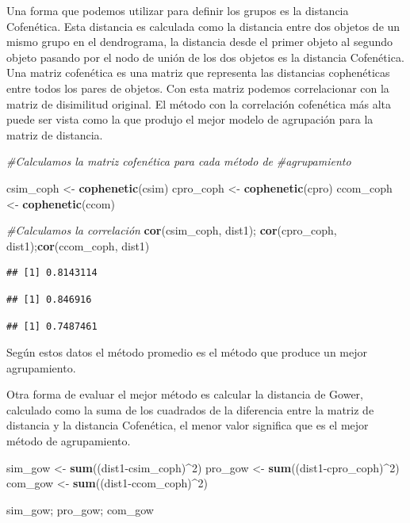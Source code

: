 \documentclass[]{book}
\newenvironment{Shaded}{\begin{snugshade}}{\end{snugshade}}
\newcommand{\KeywordTok}[1]{\textcolor[rgb]{0.13,0.29,0.53}{\textbf{{#1}}}}
\newcommand{\DecValTok}[1]{\textcolor[rgb]{0.00,0.00,0.81}{{#1}}}
\newcommand{\StringTok}[1]{\textcolor[rgb]{0.31,0.60,0.02}{{#1}}}
\newcommand{\CommentTok}[1]{\textcolor[rgb]{0.56,0.35,0.01}{\textit{{#1}}}}
\newcommand{\NormalTok}[1]{{#1}}
\begin{document}
Una forma que podemos utilizar para definir los grupos es la distancia
Cofenética. Esta distancia es calculada como la distancia entre dos
objetos de un mismo grupo en el dendrograma, la distancia desde el
primer objeto al segundo objeto pasando por el nodo de unión de los dos
objetos es la distancia Cofenética. Una matriz cofenética es una matriz
que representa las distancias cophenéticas entre todos los pares de
objetos. Con esta matriz podemos correlacionar con la matriz de
disimilitud original. El método con la correlación cofenética más alta
puede ser vista como la que produjo el mejor modelo de agrupación para
la matriz de distancia.

\begin{Shaded}
\begin{Highlighting}[]
\CommentTok{#Calculamos la matriz cofenética para cada método de}
\CommentTok{#agrupamiento}

\NormalTok{csim_coph <-}\StringTok{ }\KeywordTok{cophenetic}\NormalTok{(csim)}
\NormalTok{cpro_coph <-}\StringTok{ }\KeywordTok{cophenetic}\NormalTok{(cpro)}
\NormalTok{ccom_coph <-}\StringTok{ }\KeywordTok{cophenetic}\NormalTok{(ccom)}

\CommentTok{#Calculamos la correlación}
\KeywordTok{cor}\NormalTok{(csim_coph, dist1); }\KeywordTok{cor}\NormalTok{(cpro_coph, dist1);}\KeywordTok{cor}\NormalTok{(ccom_coph, dist1)}
\end{Highlighting}
\end{Shaded}

\begin{verbatim}
## [1] 0.8143114
\end{verbatim}

\begin{verbatim}
## [1] 0.846916
\end{verbatim}

\begin{verbatim}
## [1] 0.7487461
\end{verbatim}

Según estos datos el método promedio es el método que produce un mejor
agrupamiento.

Otra forma de evaluar el mejor método es calcular la distancia de Gower,
calculado como la suma de los cuadrados de la diferencia entre la matriz
de distancia y la distancia Cofenética, el menor valor significa que es
el mejor método de agrupamiento.

\begin{Shaded}
\begin{Highlighting}[]
\NormalTok{sim_gow <-}\StringTok{ }\KeywordTok{sum}\NormalTok{((dist1-csim_coph)^}\DecValTok{2}\NormalTok{)}
\NormalTok{pro_gow <-}\StringTok{ }\KeywordTok{sum}\NormalTok{((dist1-cpro_coph)^}\DecValTok{2}\NormalTok{)}
\NormalTok{com_gow <-}\StringTok{ }\KeywordTok{sum}\NormalTok{((dist1-ccom_coph)^}\DecValTok{2}\NormalTok{)}

\NormalTok{sim_gow; pro_gow; com_gow}
\end{Highlighting}
\end{Shaded}
\end{document}
